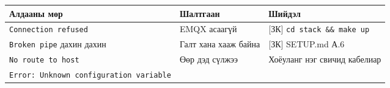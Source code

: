 \begingroup\scriptsize\begin{longtable}[]{@{}lll@{}}
\toprule
\begin{minipage}[b]{0.30\columnwidth}\raggedright
Алдааны мөр\strut
\end{minipage} & \begin{minipage}[b]{0.30\columnwidth}\raggedright
Шалтгаан\strut
\end{minipage} & \begin{minipage}[b]{0.30\columnwidth}\raggedright
Шийдэл\strut
\end{minipage}\tabularnewline
\midrule
\endhead
\begin{minipage}[t]{0.30\columnwidth}\raggedright
\texttt{Connection\ refused}\strut
\end{minipage} & \begin{minipage}[t]{0.30\columnwidth}\raggedright
EMQX асаагүй\strut
\end{minipage} & \begin{minipage}[t]{0.30\columnwidth}\raggedright
{[}ЗК{]} \texttt{cd\ stack\ \&\allowbreak{}\&\allowbreak{}\ make\ up}\strut
\end{minipage}\tabularnewline
\begin{minipage}[t]{0.30\columnwidth}\raggedright
\texttt{Broken\ pipe} дахин дахин\strut
\end{minipage} & \begin{minipage}[t]{0.30\columnwidth}\raggedright
Галт хана хааж байна\strut
\end{minipage} & \begin{minipage}[t]{0.30\columnwidth}\raggedright
{[}ЗК{]} SETUP.md А.6\strut
\end{minipage}\tabularnewline
\begin{minipage}[t]{0.30\columnwidth}\raggedright
\texttt{No\ route\ to\ host}\strut
\end{minipage} & \begin{minipage}[t]{0.30\columnwidth}\raggedright
Өөр дэд сүлжээ\strut
\end{minipage} & \begin{minipage}[t]{0.30\columnwidth}\raggedright
Хоёуланг нэг свичид кабелиар\strut
\end{minipage}\tabularnewline
\begin{minipage}[t]{0.30\columnwidth}\raggedright
\texttt{Error:\allowbreak{}\ Unknown\ configuration\ variable}\strut
\end{minipage} & \begin{minipage}[t]{0.30\columnwidth}\raggedright

\end{minipage}
\end{longtable}

